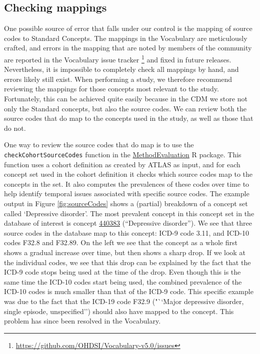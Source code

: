 \documentclass[11pt]{book}
\let\rmarkdownfootnote\footnote%
\def\footnote{\protect\rmarkdownfootnote}
\theoremstyle{definition}
\theoremstyle{definition}
\theoremstyle{definition}
\theoremstyle{remark}
\begin{document}
\hypertarget{checking-mappings}{%
\subsection{Checking mappings}\label{checking-mappings}}

One possible source of error that falls under our control is the mapping of source codes to Standard Concepts. The mappings in the Vocabulary are meticulously crafted, and errors in the mapping that are noted by members of the community are reported in the Vocabulary issue tracker \footnote{\url{https://github.com/OHDSI/Vocabulary-v5.0/issues}} and fixed in future releases. Nevertheless, it is impossible to completely check all mappings by hand, and errors likely still exist. When performing a study, we therefore recommend reviewing the mappings for those concepts most relevant to the study. Fortunately, this can be achieved quite easily because in the CDM we store not only the Standard concepts, but also the source codes. We can review both the source codes that do map to the concepts used in the study, as well as those that do not.

One way to review the source codes that do map is to use the \texttt{checkCohortSourceCodes} function in the \href{https://ohdsi.github.io/MethodEvaluation/}{MethodEvaluation} R package. This function uses a cohort definition as created by ATLAS as input, and for each concept set used in the cohort definition it checks which source codes map to the concepts in the set. It also computes the prevalences of these codes over time to help identify temporal issues associated with specific source codes. The example output in Figure \ref{fig:sourceCodes} shows a (partial) breakdown of a concept set called `Depressive disorder'. The most prevalent concept in this concept set in the database of interest is concept \href{http://athena.ohdsi.org/search-terms/terms/440383}{440383} (``Depressive disorder''). We see that three source codes in the database map to this concept: ICD-9 code 3.11, and ICD-10 codes F32.8 and F32.89. On the left we see that the concept as a whole first shows a gradual increase over time, but then shows a sharp drop. If we look at the individual codes, we see that this drop can be explained by the fact that the ICD-9 code stops being used at the time of the drop. Even though this is the same time the ICD-10 codes start being used, the combined prevalence of the ICD-10 codes is much smaller than that of the ICD-9 code. This specific example was due to the fact that the ICD-19 code F32.9 ("``Major depressive disorder, single episode, unspecified'') should also have mapped to the concept. This problem has since been resolved in the Vocabulary.
\end{document}
